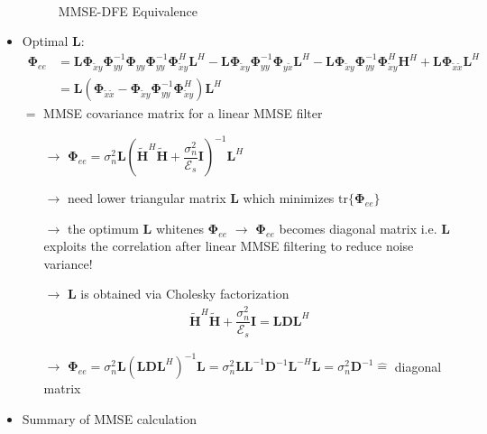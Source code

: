 \documentclass[a4paper, 10pt]{article}
\begin{document}
\begin{itemize}
\begin{align*}
	\end{align*}
	\begin{figure}[h]
		\centering
		\resizebox{\textwidth}{!}{}
		\caption{MMSE-DFE Equivalence}
		\label{MMSE_DFE_Equiv}
	\end{figure}
	\item Optimal $\mathbf{L}$:
	\begin{align*}
		\boldsymbol{\Phi}_{ee}&=\mathbf{L}\boldsymbol{\Phi}_{\tilde{x}y}\boldsymbol{\Phi}_{yy}^{-1}\boldsymbol{\Phi}_{yy}\boldsymbol{\Phi}_{yy}^{-1}\boldsymbol{\Phi}_{\tilde{x}y}^H\mathbf{L}^H
		-\mathbf{L}\boldsymbol{\Phi}_{\tilde{x}y}\boldsymbol{\Phi}_{yy}^{-1}\boldsymbol{\Phi}_{y\tilde{x}}\mathbf{L}^H
		-\mathbf{L}\boldsymbol{\Phi}_{\tilde{x}y}\boldsymbol{\Phi}_{yy}^{-1}\boldsymbol{\Phi}_{\tilde{x}y}^H\mathbf{H}^H+\mathbf{L}\boldsymbol{\Phi}_{\tilde{x}\tilde{x}}\mathbf{L}^H\\ 
		&=\mathbf{L}(\boldsymbol{\Phi}_{\tilde{x}\tilde{x}}-\boldsymbol{\Phi}_{\tilde{x}y}\boldsymbol{\Phi}_{yy}^{-1}\boldsymbol{\Phi}_{\tilde{x}y}^H)\mathbf{L}^H
	\end{align*}
	$=$ MMSE covariance matrix for a linear MMSE filter
	\begin{itemize}
		\item[$\rightarrow$]$\boldsymbol{\Phi}_{ee}=\sigma_n^2\mathbf{L}(\tilde{\mathbf{H}}^H\tilde{\mathbf{H}}+\dfrac{\sigma_n^2}{\mathcal{E}_s}\mathbf{I})^{-1}\mathbf{L}^H$
		\item[$\rightarrow$] need lower triangular matrix $\mathbf{L}$ which minimizes $\mathrm{tr}\{\boldsymbol{\Phi}_{ee}\}$
		\item[$\rightarrow$] the optimum $\mathbf{L}$ whitenes $\boldsymbol{\Phi}_{ee}$ $\rightarrow$  $\boldsymbol{\Phi}_{ee}$ becomes diagonal matrix i.e. $\mathbf{L}$ exploits the correlation after linear MMSE filtering
		to reduce noise variance!
		\item[$\rightarrow$] $\mathbf{L}$ is obtained via Cholesky factorization
		\begin{align*}
			\tilde{\mathbf{H}}^H\tilde{\mathbf{H}}+\dfrac{\sigma_n^2}{\mathcal{E}_s}\mathbf{I}=\mathbf{LDL}^H
		\end{align*}
		\item[$\rightarrow$] $\boldsymbol{\Phi}_{ee}=\sigma_n^2 \mathbf{L}(\mathbf{LDL}^H)^{-1}\mathbf{L}=\sigma_n^2\mathbf{LL}^{-1}\mathbf{D}^{-1}\mathbf{L}^{-H}\mathbf{L}=\sigma_n^2\mathbf{D}^{-1}\widehat{=}$ diagonal matrix
	\end{itemize}
	\item Summary of MMSE calculation

\end{itemize}
\end{document}
